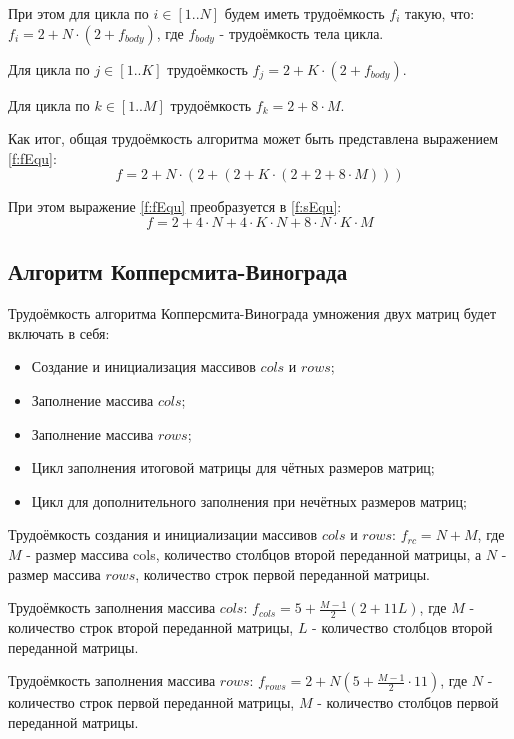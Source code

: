 \documentclass[12pt]{report}
\begin{document}
При этом для цикла по $i \in [1..N]$ будем иметь трудоёмкость $f_{i}$ такую, что: $f_{i} = 2 + N \cdot (2 + f_{body})$, где $f_{body}$ - трудоёмкость тела цикла.

Для цикла по $j \in [1..K]$ трудоёмкость $f_{j} = 2 + K \cdot (2 + f_{body})$.

Для цикла по $k \in [1..M]$ трудоёмкость $f_{k} = 2 + 8 \cdot M$.

Как итог, общая трудоёмкость алгоритма может быть представлена выражением \ref{f:fEqu}:
\begin{equation}
\label{f:fEqu}
f = 2 + N \cdot (2 + (2 + K \cdot(2 + 2 + 8 \cdot M)))
\end{equation}

При этом выражение \ref{f:fEqu} преобразуется в \ref{f:sEqu}:
\begin{equation}
\label{f:sEqu}
f = 2 + 4 \cdot N + 4 \cdot K \cdot N + 8 \cdot N \cdot K \cdot M
\end{equation}

\subsection{Алгоритм Копперсмита-Винограда}
Трудоёмкость алгоритма Копперсмита-Винограда умножения двух матриц будет включать в себя:
\begin{itemize}
\item Создание и инициализация массивов $cols$ и $rows$;
\item Заполнение массива $cols$;
\item Заполнение массива $rows$;
\item Цикл заполнения итоговой матрицы для чётных размеров матриц;
\item Цикл для дополнительного заполнения при нечётных размеров матриц;
\end{itemize}

Трудоёмкость создания и инициализации массивов $cols$ и $rows$: $f_{rc} = N + M$, где $M$ - размер массива cols, количество столбцов второй переданной матрицы, а $N$ - размер массива $rows$, количество строк первой переданной матрицы.

Трудоёмкость заполнения массива $cols$: $f_{cols} = 5 + \frac{M - 1}{2}(2 + 11L)$, где $M$ - количество строк второй переданной матрицы, $L$ - количество столбцов второй переданной матрицы.

Трудоёмкость заполнения массива $rows$: $f_{rows} = 2 + N(5 + \frac{M - 1}{2} \cdot 11)$, где $N$ - количество строк первой переданной матрицы, $M$ - количество столбцов первой переданной матрицы.
\end{document}
